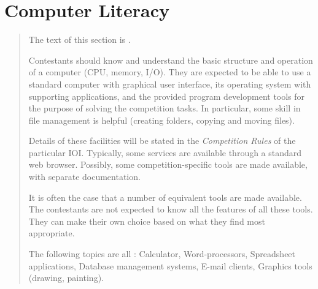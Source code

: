 \documentclass[a4paper,11pt,oneside]{article}
\newcommand{\cmark}{\ding{51}}%
\newcommand{\Ccodeonly}{{\small\cmark\faFileText}}
\newcommand{\Cnofocus}{{\small\faQuestion}}
\begin{document}

\section {Computer Literacy}%
\label{subsec:computer-literacy}

\begin{quote}
The text of this section is \Ccodeonly.

\medskip

Contestants should know and understand the basic structure and operation of a computer
(CPU, memory, I/O).
They are expected to be able to use a standard computer with graphical user interface,
its operating system with supporting applications,
and the provided program development tools
for the purpose of solving the competition tasks.
In particular,
some skill in file management is helpful (creating folders, copying and moving files).

Details of these facilities will be stated in the \emph{Competition Rules\/}
of the particular IOI.
Typically, some services are available through a standard web browser.
Possibly, some competition-specific tools are made available,
with separate documentation.

It is often the case that a number of equivalent tools are made available.
The contestants are not expected to know all the features of all these tools.
They can make their own choice based on what they find most appropriate.

\medskip

The following topics are all \Cnofocus:
  Calculator,
  Word-processors,
  Spreadsheet applications,
  Database management systems,
  E-mail clients,
  Graphics tools (drawing, painting).
\end{quote}
\end{document}
